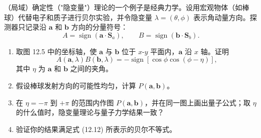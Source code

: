 \begin{question}
（局域）确定性（"隐变量"）理论的一个例子是经典力学。设用宏观物体（如棒球）代替电子和质子进行贝尔实验，并令隐变量 $\lambda=(\theta,\phi)$ 表示角动量方向。探测器只记录沿 $\mathbf a$ 和 $\mathbf b$ 方向的分量符号：
\[
A=\operatorname{sign}(\mathbf a\cdot\mathbf S_a),\qquad B=\operatorname{sign}(\mathbf b\cdot\mathbf S_b).
\]
\begin{enumerate}
\item 取图 12.5 中的坐标轴，使 $\mathbf a$ 与 $\mathbf b$ 位于 $x$-$y$ 平面内，$\mathbf a$ 沿 $x$ 轴。证明
\[
A(\mathbf a,\lambda)B(\mathbf b,\lambda)=-\operatorname{sign}[\cos\phi\cos(\phi-\eta)],
\]
其中 $\eta$ 为 $\mathbf a$ 和 $\mathbf b$ 之间的夹角。
\item 假设棒球发射方向的可能性均匀，计算 $P(\mathbf a,\mathbf b)$。
\item 在 $\eta=-\pi$ 到 $+\pi$ 的范围内作图 $P(\mathbf a,\mathbf b)$，并在同一图上画出量子公式；取 $\eta$ 的什么值时，隐变量理论与量子力学结果一致？
\item 验证你的结果满足式 (12.12) 所表示的贝尔不等式。
\end{enumerate}

\par\smallskip
{}

\end{question}
